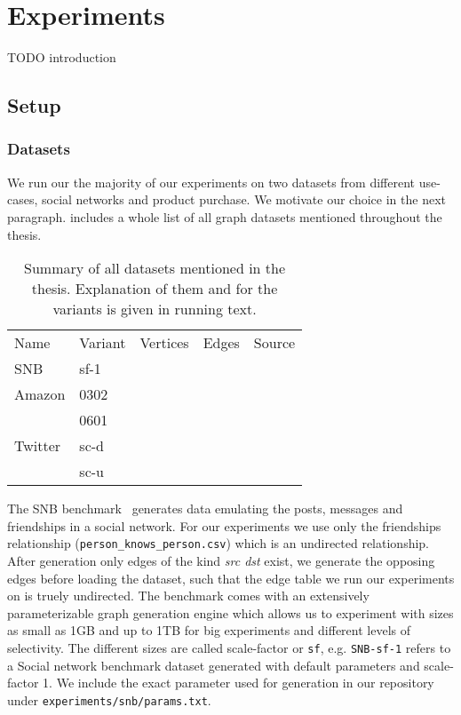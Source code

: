 \section{Experiments}

TODO introduction

\subsection{Setup}

\subsubsection{Datasets}
We run our the majority of our experiments on two datasets from different use-cases, social networks and product purchase.
We motivate our choice in the next paragraph.
 includes a whole list of all graph datasets mentioned throughout the thesis.

\begin{table}[]
    \begin{tabular}{lllll}
        Name    & Variant & Vertices & Edges & Source          \\
        SNB     & sf-1    &          &       & \cite{snb}      \\
        Amazon  & 0302    &          &       & \cite{snapnets} \\
                & 0601    &          &       & \cite{snapnets} \\
        Twitter & sc-d    &          &       & \cite{snapnets} \\
                & sc-u    &          &       & \cite{snapnets}
    \end{tabular}
    \caption{Summary of all datasets mentioned in the thesis.
      Explanation of them and for the variants is given in running text.
    }
    \label{table:datasets}
\end{table}


The SNB benchmark~\cite{snb} generates data emulating the posts, messages and friendships in a social network.
For our experiments we use only the friendships relationship (\texttt{person_knows_person.csv}) which is an undirected relationship.
After generation only edges of the kind \textit{src \le dst} exist, we generate the opposing edges before loading the dataset, such that the edge table we run our experiments
on is truely undirected.
The benchmark comes with an extensively parameterizable graph generation engine
which allows us to experiment with sizes as small as 1GB and up to 1TB for big experiments and different levels of selectivity.
The different sizes are called scale-factor or \texttt{sf}, e.g. \texttt{SNB-sf-1} refers to a Social network benchmark dataset generated with
default parameters and scale-factor 1.
We include the exact parameter used for generation in our repository under \texttt{experiments/snb/params.txt}. %

